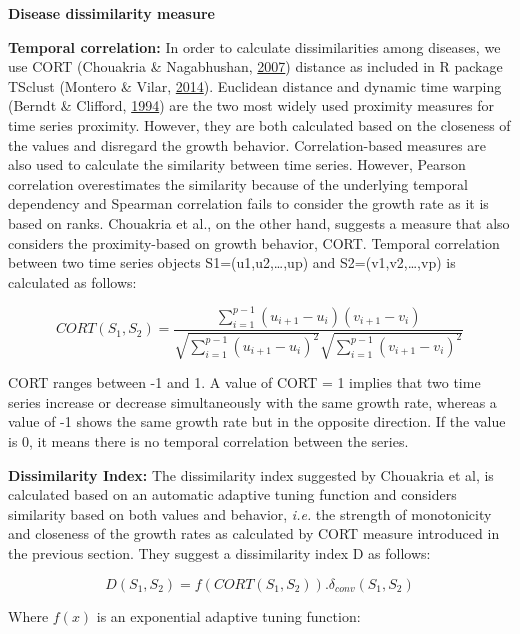 \documentclass[12pt,twoside]{unicam}
\begin{document}
\textbf{Disease dissimilarity measure}

\textbf{Temporal correlation:} In order to calculate dissimilarities among diseases, we use CORT (Chouakria \& Nagabhushan, \protect\hyperlink{ref-Chouakria2007}{2007}) distance as included in R package TSclust (Montero \& Vilar, \protect\hyperlink{ref-Montero2014}{2014}). Euclidean distance and dynamic time warping (Berndt \& Clifford, \protect\hyperlink{ref-Berndt1994}{1994}) are the two most widely used proximity measures for time series proximity. However, they are both calculated based on the closeness of the values and disregard the growth behavior. Correlation-based measures are also used to calculate the similarity between time series. However, Pearson correlation overestimates the similarity because of the underlying temporal dependency and Spearman correlation fails to consider the growth rate as it is based on ranks. Chouakria et al., on the other hand, suggests a measure that also considers the proximity-based on growth behavior, CORT. Temporal correlation between two time series objects S1=(u1,u2,\ldots,up) and S2=(v1,v2,\ldots,vp) is calculated as follows:

\begin{equation}
    CORT(S_1,S_2) = \dfrac{\sum_{i=1}^{p-1}{(u_{i+1}-u_i)(v_{i+1}-v_i)}}{\sqrt{\sum_{i=1}^{p-1}{(u_{i+1}-u_i)^2}}\sqrt{\sum_{i=1}^{p-1}{(v_{i+1}-v_i)^2}}}
  \label{eq:discort}
\end{equation}

CORT ranges between -1 and 1. A value of CORT = 1 implies that two time series increase or decrease simultaneously with the same growth rate, whereas a value of -1 shows the same growth rate but in the opposite direction. If the value is 0, it means there is no temporal correlation between the series.

\textbf{Dissimilarity Index:} The dissimilarity index suggested by Chouakria et al, is calculated based on an automatic adaptive tuning function and considers similarity based on both values and behavior, \emph{i.e.} the strength of monotonicity and closeness of the growth rates as calculated by CORT measure introduced in the previous section. They suggest a dissimilarity index D as follows:

\begin{equation}
    D(S_1,S_2)=f(CORT(S_1,S_2)).\delta_{conv}(S_1,S_2)
  \label{eq:disdissimilarity}
\end{equation}

Where \(f(x)\) is an exponential adaptive tuning function:
\end{document}
